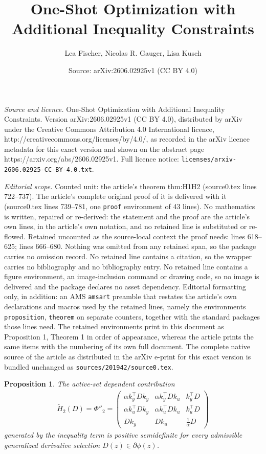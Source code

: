 \documentclass[10pt,a4paper]{amsart}
\title{One-Shot Optimization with Additional Inequality Constraints}
\author{Lea Fischer, Nicolas R. Gauger, Lisa Kusch}
\date{Source: arXiv:2606.02925v1 (CC BY 4.0)}
\newtheorem{proposition}{Proposition}
\begin{document}
\maketitle

\noindent\emph{Source and licence.} One-Shot Optimization with Additional Inequality Constraints. Version arXiv:2606.02925v1 (CC BY 4.0), distributed by arXiv under the Creative Commons Attribution 4.0 International licence, http://creativecommons.org/licenses/by/4.0/, as recorded in the arXiv licence metadata for this exact version and shown on the abstract page https://arxiv.org/abs/2606.02925v1. Full licence notice: \texttt{licenses/arxiv-2606.02925-CC-BY-4.0.txt}.\par\smallskip

\noindent\textit{Editorial scope.} Counted unit: the article's theorem thm:H1H2 (source0.tex lines 722--737). The article's complete original proof of it is delivered with it (source0.tex lines 739--781, one \texttt{proof} environment of 43 lines). No mathematics is written, repaired or re-derived: the statement and the proof are the article's own lines, in the article's own notation, and no retained line is substituted or re-flowed.  Retained uncounted as the source-local context the proof needs: lines 618--625; lines 666--680.  Nothing was omitted from any retained span, so the package carries no omission record.  No retained line contains a citation, so the wrapper carries no bibliography and no bibliography entry.  No retained line contains a figure environment, an image-inclusion command or drawing code, so no image is delivered and the package declares no asset dependency.  Editorial formatting only, in addition: an AMS \texttt{amsart} preamble that restates the article's own declarations and macros used by the retained lines, namely the environments \texttt{proposition}, \texttt{theorem} on separate counters, together with the standard packages those lines need.  The retained environments print in this document as Proposition 1, Theorem 1 in order of appearance, whereas the article prints the same items with the numbering of its own full document.  The complete native source of the article as distributed in the arXiv e-print for this exact version is bundled unchanged as \texttt{sources/201942/source0.tex}.
\begin{proposition}
\label{prophtwo}
    The active-set dependent contribution 
    \begin{align}
        \tilde H_2(D) = \Phi''_{2} = \begin{pmatrix} \alpha k_y^\top D k_y & \alpha k_y^\top D k_u & k_y^\top D \\[1ex] \alpha k_u^\top D k_y & \alpha k_u^\top D k_u & k_u^\top D \\[1ex] D k_y & D k_u & \frac1\alpha D \end{pmatrix}
    \end{align} 
    generated by the inequality term is positive semidefinite for every admissible generalized derivative selection $D(z)\in\partial\phi(z)$.
\end{proposition}
\end{document}
